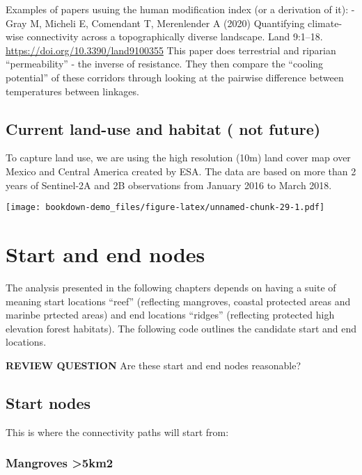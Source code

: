 \documentclass[
]{book}
\begin{document}
Examples of papers usuing the human modification index (or a derivation of it):
- Gray M, Micheli E, Comendant T, Merenlender A (2020) Quantifying climate-wise connectivity across a topographically diverse landscape. Land 9:1--18. \url{https://doi.org/10.3390/land9100355}
This paper does terrestrial and riparian ``permeability'' - the inverse of resistance. They then compare the ``cooling potential'' of these corridors through looking at the pairwise difference between temperatures between linkages.

\hypertarget{current-land-use-and-habitat-not-future}{%
\subsection{Current land-use and habitat ( not future)}\label{current-land-use-and-habitat-not-future}}

To capture land use, we are using the high resolution (10m) land cover map over Mexico and Central America created by ESA. The data are based on more than 2 years of Sentinel-2A and 2B observations from January 2016 to March 2018.

\texttt{[image: bookdown-demo\_files/figure-latex/unnamed-chunk-29-1.pdf]}

\hypertarget{start-and-end-nodes}{%
\section{Start and end nodes}\label{start-and-end-nodes}}

The analysis presented in the following chapters depends on having a suite of meaning start locations ``reef'' (reflecting mangroves, coastal protected areas and marinbe prtected areas) and end locations ``ridges'' (reflecting protected high elevation forest habitats). The following code outlines the candidate start and end locations.

\textbf{REVIEW QUESTION} Are these start and end nodes reasonable?

\hypertarget{start-nodes}{%
\subsection{Start nodes}\label{start-nodes}}

This is where the connectivity paths will start from:

\hypertarget{mangroves-5km2}{%
\subsubsection{Mangroves \textgreater5km2}\label{mangroves-5km2}}
\end{document}
